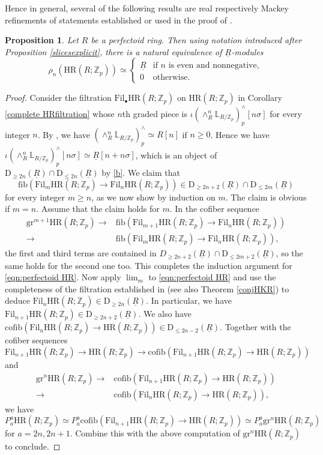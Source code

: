 \documentclass[10pt]{amsart}
\newtheorem{prop}[thm]{Proposition}
\theoremstyle{definition}
\numberwithin{equation}{section}
\renewcommand{\L}{\mathbb{L}}
\newcommand{\Z}{\mathbb{Z}}
\newcommand{\rD}{\mathrm{D}}
\newcommand{\ul}{\underline}
\newcommand{\fib}{\mathrm{fib}}
\newcommand{\cofib}{\mathrm{cofib}}
\newcommand{\gr}{\mathrm{gr}}
\newcommand{\Fil}{\mathrm{Fil}}
\newcommand{\HR}{\mathrm{HR}}
\begin{document}
Hence in general, several of the following results are real respectively Mackey refinements of statements established or used in the proof of \cite[Theorem 6.1]{BMS19}.
\begin{prop}
\label{prop:perfectoid HR}
Let $R$ be a perfectoid ring.
Then using notation introduced after Proposition \ref{slicesexplicit},
there is a natural equivalence of $\ul{R}$-modules
\[
\rho_n(\HR(R;\Z_p))
\simeq
\left\{
\begin{array}{ll}
\ul{R}& \text{if $n$ is even and nonnegative},
\\
0 & \text{otherwise}.
\end{array}
\right.
\]
\end{prop}
\begin{proof}
Consider the filtration $\Fil_\bullet\HR(R;\Z_p)$ on $\HR(R;\Z_p)$ in Corollary \ref{complete HRfiltration} whose $n$th graded piece is $\iota (\wedge_R^n \L_{R/\Z_p})_p^\wedge[n\sigma]$ for every integer $n$.
By \cite[Proposition 4.19(2)]{BMS19},
we have $(\wedge_R^n \L_{R/\Z_p})_p^\wedge \simeq R[n]$ if $n\geq 0$.
Hence we have
$\iota (\wedge_R^n \L_{R/\Z_p})_p^\wedge[n\sigma]\simeq \ul{R}[n+n\sigma]$,
which
is an object of $\rD_{\geq 2n}(\ul{R})\cap \rD_{\leq 2n}(\ul{R})$ by
\eqref{b}.
We claim that
\begin{equation}
\label{eqn:perfectoid HR}
\fib(\Fil_{m}\HR(R;\Z_p)\to \Fil_n\HR(R;\Z_p))\in \rD_{\geq 2n+2}(\ul{R})\cap \rD_{\leq 2m}(\ul{R})
\end{equation}
for every integer $m\geq n$, as we now show by induction on $m$. 
The claim is obvious if $m=n$.
Assume that the claim holds for $m$.
In the cofiber sequence
\begin{align*}
\gr^{m+1} \HR(R;\Z_p)
\to &
\fib(\Fil_{m+1} \HR(R;\Z_p)\to \Fil_n\HR(R;\Z_p))
\\
\to &
\fib(\Fil_m \HR(R;\Z_p)\to \Fil_n\HR(R;\Z_p)),
\end{align*}
the first and third terms are contained in $D_{\geq 2n+2}(\ul{R})\cap \rD_{\leq 2m+2}(\ul{R})$, so the same holds for the second one too.
This completes the induction argument for \eqref{eqn:perfectoid HR}.
Now apply $\lim_m$ to \eqref{eqn:perfectoid HR}
and use the completeness of the filtration established in \cite{Par23} (see also Theorem \ref{conjHKR}) to deduce $\Fil_n\HR(R;\Z_p)\in \rD_{\geq 2n}(\ul{R})$.
In particular,
we have $\Fil_{n+1}\HR(R;\Z_p)\in \rD_{\geq 2n+2}(\ul{R})$.
We also have $\cofib(\Fil_{n}\HR(R;\Z_p)\to \HR(R;\Z_p))\in \rD_{\leq 2n-2}(\ul{R})$.
Together with the cofiber sequences
\[
\Fil_{n+1}\HR(R;\Z_p)
\to
\HR(R;\Z_p)
\to
\cofib(\Fil_{n+1}\HR(R;\Z_p)\to \HR(R;\Z_p))
\]
and
\begin{align*}
\gr^n\HR(R;\Z_p)
\to &
\cofib(\Fil_{n+1}\HR(R;\Z_p)\to \HR(R;\Z_p))
\\
\to &
\cofib(\Fil_{n}\HR(R;\Z_p)\to \HR(R;\Z_p)),
\end{align*}
we have
\[
P_{a}^{a} \HR(R;\Z_p)\simeq P_a^a \cofib(\Fil_{n+1}\HR(R;\Z_p)\to \HR(R;\Z_p))
\simeq
P_{a}^{a}\gr^n \HR(R;\Z_p)
\]
for $a=2n,2n+1$.
Combine this with the above computation of $\gr^n \HR(R;\Z_p)$ to conclude.
\end{proof}
\end{document}
